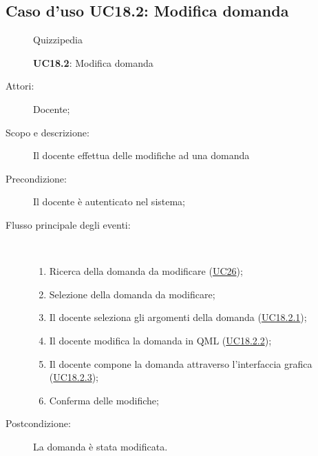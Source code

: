 \subsection{Caso d'uso UC18.2: Modifica domanda}
\begin{figure}[H]
	\centering
	\begin{resizedtikzpicture}{\textwidth}
		\begin{umlsystem}[x=0, fill=lightgray!20]{Quizzipedia}
		\end{umlsystem}
	\end{resizedtikzpicture}
	\caption{\textbf{UC18.2}: Modifica domanda}
	\label{UC18.2}
\end{figure}
\begin{description}
	\item[Attori:] Docente;
	\item[Scopo e descrizione:] Il docente effettua delle modifiche ad una domanda 
	\item[Precondizione:] Il docente è autenticato nel sistema;
	
	\item[Flusso principale degli eventi:] \ 
	\begin{enumerate}
		\item Ricerca della domanda da modificare (\hyperlink{UC26}{UC26});
		\item Selezione della domanda da modificare;
		\item Il docente seleziona gli argomenti della domanda	 (\hyperlink{UC18.2.1}{UC18.2.1});
		\item Il docente modifica la domanda in QML	 (\hyperlink{UC18.2.2}{UC18.2.2});
		\item Il docente compone la domanda attraverso l'interfaccia grafica (\hyperlink{UC18.2.3}{UC18.2.3});
		\item Conferma delle modifiche;
		
	\end{enumerate}
	\item[Postcondizione:] La domanda è stata modificata.
\end{description}
\hypertarget{UC18.2.1}{}
